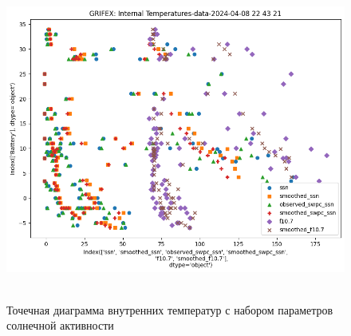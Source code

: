 \documentclass[14pt, a4paper]{extreport}
\begin{document}
    \begin{figure}[h!tbp]
        \centering
        \includegraphics[width=1.0\textwidth]{grifex_battery_vs_solar}
        ~\caption{Точечная диаграмма внутренних температур с набором параметров солнечной активности}
        \label{fig:grifex_battery_vs_solar}
    \end{figure}
\end{document}
